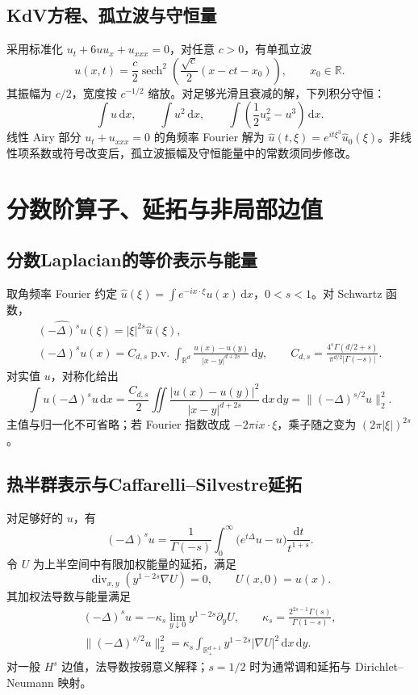 \documentclass[../main.tex]{subfiles}
\begin{document}
\subsection{KdV方程、孤立波与守恒量}
采用标准化 $u_t+6uu_x+u_{xxx}=0$，对任意 $c>0$，有单孤立波
\[
u(x,t)=\frac c2\operatorname{sech}^2
\left(\frac{\sqrt c}{2}(x-ct-x_0)\right),\qquad x_0\in\mathbb R.
\]
其振幅为 $c/2$，宽度按 $c^{-1/2}$ 缩放。对足够光滑且衰减的解，下列积分守恒：
\[
\int u\,\mathrm dx,\qquad\int u^2\,\mathrm dx,\qquad
\int\left(\frac12u_x^2-u^3\right)\,\mathrm dx.
\]
线性 Airy 部分 $u_t+u_{xxx}=0$ 的角频率 Fourier 解为 $\widehat u(t,\xi)=e^{it\xi^3}\widehat u_0(\xi)$。非线性项系数或符号改变后，孤立波振幅及守恒能量中的常数须同步修改。

\section{分数阶算子、延拓与非局部边值}
\subsection{分数Laplacian的等价表示与能量}
取角频率 Fourier 约定 $\widehat u(\xi)=\int e^{-ix\cdot\xi}u(x)\,\mathrm dx$，$0<s<1$。对 Schwartz 函数，
\begin{gather*}
\widehat{(-\Delta)^su}(\xi)=|\xi|^{2s}\widehat u(\xi),\\
(-\Delta)^su(x)=C_{d,s}\operatorname{p.v.}\int_{\mathbb R^d}
\frac{u(x)-u(y)}{|x-y|^{d+2s}}\,\mathrm dy,\qquad
C_{d,s}=\frac{4^s\Gamma(d/2+s)}{\pi^{d/2}|\Gamma(-s)|}.
\end{gather*}
对实值 $u$，对称化给出
\[
\int u(-\Delta)^su\,\mathrm dx
=\frac{C_{d,s}}2\iint\frac{|u(x)-u(y)|^2}{|x-y|^{d+2s}}\,\mathrm dx\,\mathrm dy
=\|(-\Delta)^{s/2}u\|_2^2.
\]
主值与归一化不可省略；若 Fourier 指数改成 $-2\pi ix\cdot\xi$，乘子随之变为 $(2\pi|\xi|)^{2s}$。
\subsection{热半群表示与Caffarelli--Silvestre延拓}
对足够好的 $u$，有
\[
(-\Delta)^su=\frac1{\Gamma(-s)}\int_0^\infty
\bigl(e^{t\Delta}u-u\bigr)\frac{\mathrm dt}{t^{1+s}}.
\]
令 $U$ 为上半空间中有限加权能量的延拓，满足
\[
\operatorname{div}_{x,y}(y^{1-2s}\nabla U)=0,\qquad U(x,0)=u(x).
\]
其加权法导数与能量满足
\begin{gather*}
(-\Delta)^su=-\kappa_s\lim_{y\downarrow0}y^{1-2s}\partial_yU,\qquad
\kappa_s=\frac{2^{2s-1}\Gamma(s)}{\Gamma(1-s)},\\
\|(-\Delta)^{s/2}u\|_2^2
=\kappa_s\int_{\mathbb R^{d+1}_+}y^{1-2s}|\nabla U|^2\,\mathrm dx\,\mathrm dy.
\end{gather*}
对一般 $H^s$ 边值，法导数按弱意义解释；$s=1/2$ 时为通常调和延拓与 Dirichlet--Neumann 映射。
\end{document}
